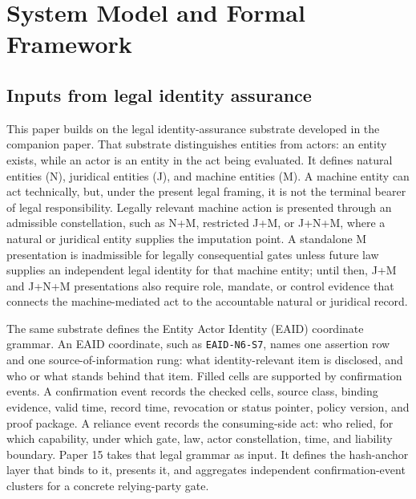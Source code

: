 \documentclass[oneside,10pt]{swissi}
\begin{document}
\bigskip

\section{System Model and Formal Framework}
\label{sec:model}

\subsection{Inputs from legal identity assurance}

This paper builds on the legal identity-assurance substrate developed in the companion paper.\cite{kurz2026actorassurance} That substrate distinguishes entities from actors: an entity exists, while an actor is an entity in the act being evaluated. It defines natural entities (N), juridical entities (J), and machine entities (M). A machine entity can act technically, but, under the present legal framing, it is not the terminal bearer of legal responsibility. Legally relevant machine action is presented through an admissible constellation, such as N+M, restricted J+M, or J+N+M, where a natural or juridical entity supplies the imputation point. A standalone M presentation is inadmissible for legally consequential gates unless future law supplies an independent legal identity for that machine entity; until then, J+M and J+N+M presentations also require role, mandate, or control evidence that connects the machine-mediated act to the accountable natural or juridical record.

The same substrate defines the Entity Actor Identity (EAID) coordinate grammar. An EAID coordinate, such as \texttt{EAID-N6-S7}, names one assertion row and one source-of-information rung: what identity-relevant item is disclosed, and who or what stands behind that item. Filled cells are supported by confirmation events. A confirmation event records the checked cells, source class, binding evidence, valid time, record time, revocation or status pointer, policy version, and proof package. A reliance event records the consuming-side act: who relied, for which capability, under which gate, law, actor constellation, time, and liability boundary. Paper 15 takes that legal grammar as input. It defines the hash-anchor layer that binds to it, presents it, and aggregates independent confirmation-event clusters for a concrete relying-party gate.
\end{document}
